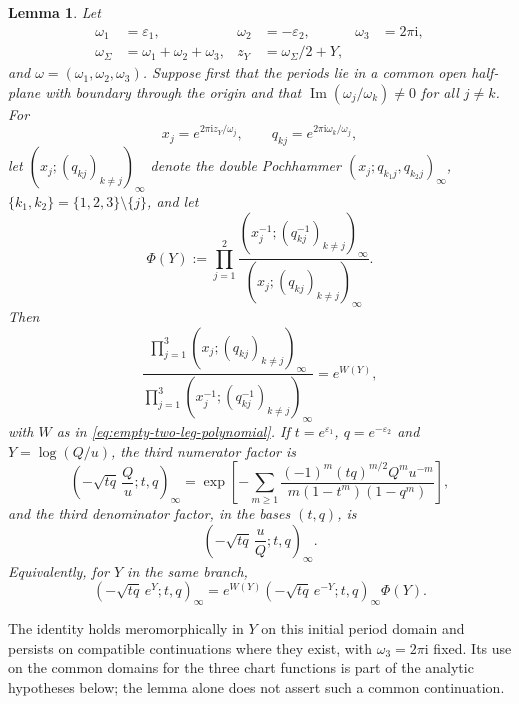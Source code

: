 \documentclass{amsart}
\newtheorem{lemma}{Lemma}
\theoremstyle{definition}
\numberwithin{equation}{section}
\newcommand{\eps}{\varepsilon}
\begin{document}
\begin{lemma}
\label{lem:triple-sine-continuation}
Let
\[
\begin{aligned}
 \omega_1&=\eps_1,& \omega_2&=-\eps_2,&
 \omega_3&=2\pi\mathrm{i},\\
 \omega_{\Sigma}&=\omega_1+\omega_2+\omega_3,&
 z_Y&=\omega_{\Sigma}/2+Y,&&
\end{aligned}
\]
and \(\omega=(\omega_1,\omega_2,\omega_3)\).  Suppose first that the periods lie in a common open half-plane with boundary through the origin and that \(\operatorname{Im}(\omega_j/\omega_k)\ne0\) for all \(j\ne k\).  For
\[
 x_j=e^{2\pi\mathrm{i}z_Y/\omega_j},\qquad
 q_{kj}=e^{2\pi\mathrm{i}\omega_k/\omega_j},
\]
let \((x_j;(q_{kj})_{k\ne j})_\infty\) denote the double Pochhammer \((x_j;q_{k_1j},q_{k_2j})_\infty\), \(\{k_1,k_2\}=\{1,2,3\}\setminus\{j\}\), and let
\begin{equation}
 \Phi(Y)
 :=\prod_{j=1}^2
 \frac{(x_j^{-1};(q_{kj}^{-1})_{k\ne j})_\infty}
 {(x_j;(q_{kj})_{k\ne j})_\infty}.
\label{eq:modular-connection-factor}
\end{equation}
Then
\begin{equation}
 \frac{\displaystyle\prod_{j=1}^3
 (x_j;(q_{kj})_{k\ne j})_\infty}
 {\displaystyle\prod_{j=1}^3
 (x_j^{-1};(q_{kj}^{-1})_{k\ne j})_\infty}
 =e^{W(Y)},
\label{eq:triple-sine-connection}
\end{equation}
with \(W\) as in \eqref{eq:empty-two-leg-polynomial}.  If \(t=e^{\eps_1}\), \(q=e^{-\eps_2}\) and \(Y=\log(Q/u)\), the third numerator factor is
\begin{equation}
 \left(-\sqrt{tq}\,\frac Qu;t,q\right)_\infty
 =\exp\left[
 -\sum_{m\geq1}
 \frac{(-1)^m(tq)^{m/2}Q^mu^{-m}}
 {m(1-t^m)(1-q^m)}\right],
\label{eq:outgoing-empty-product}
\end{equation}
and the third denominator factor, in the bases \((t,q)\), is
\begin{equation}
 \left(-\sqrt{tq}\,\frac uQ;t,q\right)_\infty.
\label{eq:incoming-empty-product}
\end{equation}
Equivalently, for \(Y\) in the same branch,
\begin{equation}
 (-\sqrt{tq}\,e^Y;t,q)_\infty
 =e^{W(Y)}(-\sqrt{tq}\,e^{-Y};t,q)_\infty
  \Phi(Y).
\label{eq:exact-double-Pochhammer-connection}
\end{equation}
\end{lemma}

The identity holds meromorphically in \(Y\) on this initial period domain and persists on compatible continuations where they exist, with \(\omega_3=2\pi\mathrm i\) fixed.  Its use on the common domains for the three chart functions is part of the analytic hypotheses below; the lemma alone does not assert such a common continuation.
\end{document}
